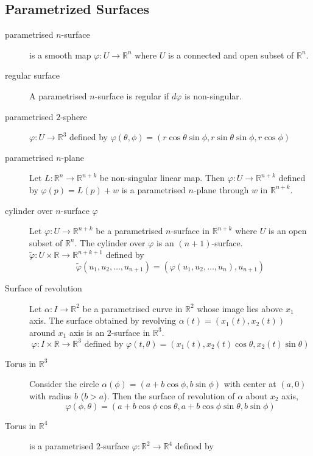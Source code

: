 \subsection{Parametrized Surfaces}
\begin{description}
	\item[parametrised $n$-surface] is a smooth map $\varphi : U \to \mathbb{R}^n$ where $U$ is a connected and open subset of $\mathbb{R}^n$.
	\item[regular surface] A parametrised $n$-surface is regular if $d\varphi$ is non-singular.
	\item[parametrised $2$-sphere] $\varphi : U \to \mathbb{R}^3$ defined by $\varphi(\theta,\phi) = (r\cos \theta \sin \phi,r \sin \theta \sin \phi,r\cos \phi)$
	\item[parametrised $n$-plane] Let $L : \mathbb{R}^n \to \mathbb{R}^{n+k}$ be non-singular linear map. Then $\varphi : U \to \mathbb{R}^{n+k}$ defined by $\varphi(p) = L(p) + w$ is a parametrised $n$-plane through $w$ in $\mathbb{R}^{n+k}$.
	\item[cylinder over $n$-surface $\varphi$] Let $\varphi : U \to \mathbb{R}^{n+k}$ be a parametrised $n$-surface in $\mathbb{R}^{n+k}$ where $U$ is an open subset of $\mathbb{R}^n$. The cylinder over $\varphi$ is an $(n+1)$-surface. $\tilde{\varphi} : U \times \mathbb{R} \to \mathbb{R}^{n+k+1}$ defined by 
	\begin{equation}
		\tilde{\varphi}(u_1,u_2,\dots,u_{n+1}) = (\varphi(u_1,u_2,\dots,u_n),u_{n+1})
	\end{equation}
\item[Surface of revolution] Let $\alpha : I \to \mathbb{R}^2$ be a parametrised curve in $\mathbb{R}^2$ whose image lies above $x_1$ axis. The surface obtained by revolving $\alpha(t)=(x_1(t),x_2(t))$ around $x_1$ axis is an $2$-surface in $\mathbb{R}^3$.
	\begin{equation}
		\varphi : I \times \mathbb{R} \to \mathbb{R}^3 \text{ defined by } \varphi(t,\theta) = \left( x_1(t),x_2(t)\cos \theta, x_2(t)\sin \theta \right)
	\end{equation}
\item[Torus in $\mathbb{R}^3$] Consider the circle $\alpha(\phi) = (a+b\cos \phi,b\sin \phi)$ with center at $(a,0)$ with radius $b$ ($b>a$). Then the surface of revolution of $\alpha$ about $x_2$ axis, 
	\begin{equation}
		\varphi(\phi,\theta) = (a+b\cos \phi \cos \theta,a+b\cos \phi \sin \theta,b\sin \phi)
	\end{equation}
	\item[Torus in $\mathbb{R}^4$] is a parametrised $2$-surface $\varphi : \mathbb{R}^2 \to \mathbb{R}^4$ defined by

\end{description}
